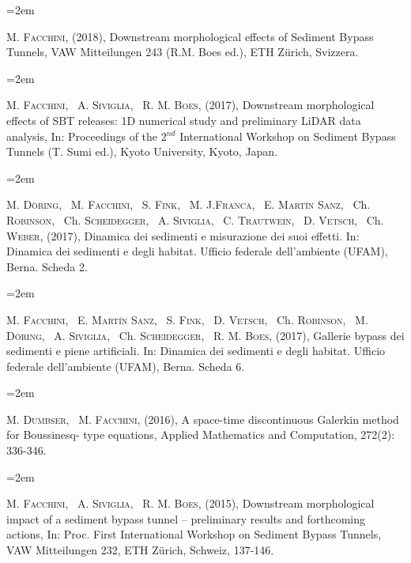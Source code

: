 \documentclass{scrartcl}
\newcommand{\MarginText}[1]{\marginpar{\raggedleft\itshape\small#1}} %
\newcommand{\Description}[1]{\hangindent=2em\hangafter=0\noindent\raggedright\footnotesize{#1}\par\normalsize\vspace{1em}} %
\begin{document}
\begin{cv}{}

\Description{\MarginText{2018}
	M. \textsc{Facchini}, (2018), Downstream morphological effects of Sediment Bypass Tunnels, VAW Mitteilungen 243 (R.M. Boes ed.), ETH Z\"urich, Svizzera.}


\Description{\MarginText{2017}
	M. \textsc{Facchini}, ~A. \textsc{Siviglia}, ~R. M. \textsc{Boes}, (2017), Downstream morphological effects of SBT releases: 1D numerical study and preliminary LiDAR data analysis, In: Proceedings of the 2$^{nd}$ International Workshop on Sediment Bypass Tunnels (T. Sumi ed.), Kyoto University, Kyoto, Japan.}

	\Description{
	M. \textsc{Döring}, ~M. \textsc{Facchini}, ~S. \textsc{Fink}, ~M. J.\textsc{Franca}, ~E. \textsc{Martín Sanz}, ~Ch. \textsc{Robinson}, ~Ch. \textsc{Scheidegger}, ~A. \textsc{Siviglia}, ~C. \textsc{Trautwein}, ~D. \textsc{Vetsch}, ~Ch. \textsc{Weber}, (2017), Dinamica dei sedimenti e misurazione dei suoi effetti. In: Dinamica dei sedimenti e degli habitat. Ufficio federale dell’ambiente (UFAM), Berna. Scheda 2.}

	\Description{
	M. \textsc{Facchini}, ~E. \textsc{Martín Sanz}, ~S. \textsc{Fink}, ~D. \textsc{Vetsch}, ~Ch. \textsc{Robinson}, ~M. \textsc{Döring}, ~A. \textsc{Siviglia}, ~Ch. \textsc{Scheidegger}, ~R. M. \textsc{Boes}, (2017), Gallerie bypass dei sedimenti e piene artificiali. In: Dinamica dei sedimenti e degli habitat. Ufficio federale dell’ambiente (UFAM), Berna. Scheda 6.}


\Description{\MarginText{2016}
	M. \textsc{Dumbser}, ~M. \textsc{Facchini}, (2016), A space-time discontinuous Galerkin method for Boussinesq- type equations, Applied Mathematics and Computation, 272(2): 336-346.}


\Description{\MarginText{2015}
	M. \textsc{Facchini}, ~A. \textsc{Siviglia}, ~R. M. \textsc{Boes}, (2015), Downstream morphological impact of a sediment bypass tunnel -- preliminary results and forthcoming actions, In: Proc. First International Workshop on Sediment Bypass Tunnels, VAW Mitteilungen 232, ETH Z\"urich, Schweiz, 137-146.}


\vspace{1em} %


\end{cv}
\end{document}
